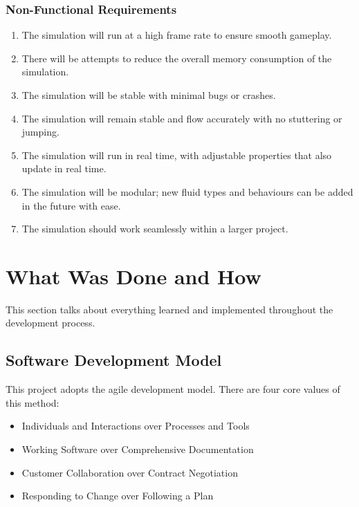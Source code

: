 \documentclass[12pt]{article}
\begin{document}
    \subsubsection{Non-Functional Requirements}

    \begin{enumerate}[label=\textbf{N.F.R. \arabic*}]
        \item The simulation will run at a high frame rate to ensure smooth gameplay.
        \item There will be attempts to reduce the overall memory consumption of the simulation.
        \item The simulation will be stable with minimal bugs or crashes.
        \item The simulation will remain stable and flow accurately with no stuttering or jumping.
        \item The simulation will run in real time, with adjustable properties that also update in real time.
        \item The simulation will be modular; new fluid types and behaviours can be added in the future with ease.
        \item The simulation should work seamlessly within a larger project.
    \end{enumerate}

    \newpage

    \section{What Was Done and How}
    \label{sec:whatwasdoneandhow}

    This section talks about everything learned and implemented throughout the development process.

    \subsection{Software Development Model}

    This project adopts the agile development model. There are four core values of this method\cite{geekagile}:
    
    \begin{itemize}
        \item Individuals and Interactions over Processes and Tools
        \item Working Software over Comprehensive Documentation
        \item Customer Collaboration over Contract Negotiation
        \item Responding to Change over Following a Plan
    \end{itemize}
\end{document}
